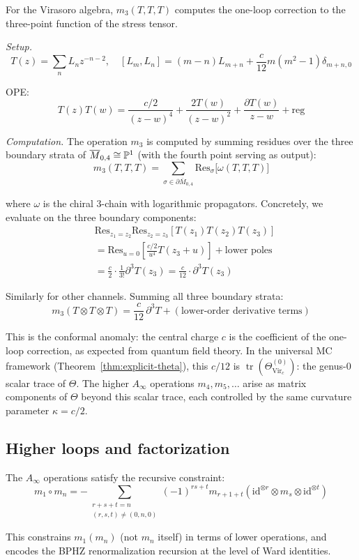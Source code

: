 \begin{example}\label{ex:virasoro-one-loop}
For the Virasoro algebra, $m_3(T,T,T)$ computes the one-loop correction to the 
three-point function of the stress tensor.

\noindent\emph{Setup.}
\[T(z) = \sum_n L_n z^{-n-2}, \quad [L_m, L_n] = (m-n)L_{m+n} +
\frac{c}{12}m(m^2-1)\delta_{m+n,0}\]

OPE:
\[T(z)T(w) = \frac{c/2}{(z-w)^4} + \frac{2T(w)}{(z-w)^2} + 
\frac{\partial T(w)}{z-w} + \text{reg}\]

\noindent\emph{Computation.}
The operation $m_3$ is computed by summing residues over the three
boundary strata of $\overline{M}_{0,4} \cong \mathbb{P}^1$ (with the fourth
point serving as output):
\[m_3(T, T, T) = \sum_{\sigma \in \partial \overline{M}_{0,4}}
\mathrm{Res}_\sigma\bigl[\omega(T,T,T)\bigr]\]

where $\omega$ is the chiral 3-chain with logarithmic propagators.
Concretely, we evaluate on the three boundary components:
\begin{align*}
&\text{Res}_{z_1=z_2}\text{Res}_{z_2=z_3}[T(z_1)T(z_2)T(z_3)] \\
&= \text{Res}_{u=0}\left[\frac{c/2}{u^4}T(z_3 + u)\right] + \text{lower poles} \\
&= \frac{c}{2} \cdot \frac{1}{3!}\partial^3 T(z_3) = \frac{c}{12} \cdot \partial^3 T(z_3)
\end{align*}

Similarly for other channels. Summing all three boundary strata:
\[m_3(T \otimes T \otimes T) = \frac{c}{12}\,\partial^3 T + (\text{lower-order derivative terms})\]

This is the conformal anomaly: the central charge $c$
is the coefficient of the one-loop correction, as expected from quantum
field theory.  In the universal MC framework
(Theorem~\ref{thm:explicit-theta}), this $c/12$ is
$\operatorname{tr}(\Theta_{\mathrm{Vir}_c}^{(0)})$: the
genus-$0$ scalar trace of $\Theta$.  The higher $A_\infty$
operations $m_4, m_5, \ldots$ arise as matrix components
of $\Theta$ beyond this scalar trace, each controlled
by the same curvature parameter $\kappa = c/2$.
\end{example}

\subsection{Higher loops and factorization}

\begin{theorem}
\label{thm:ainfty-constraint-formula}
The $A_\infty$ operations satisfy the recursive constraint:
\[m_1 \circ m_n = -\sum_{\substack{r+s+t=n \\ (r,s,t) \neq (0,n,0)}} (-1)^{rs+t} m_{r+1+t}(\mathrm{id}^{\otimes r} \otimes m_s \otimes \mathrm{id}^{\otimes t})\]

This constrains $m_1(m_n)$ (not $m_n$ itself) in terms of lower operations,
and encodes the BPHZ renormalization recursion at the level of Ward identities.
\end{theorem}

